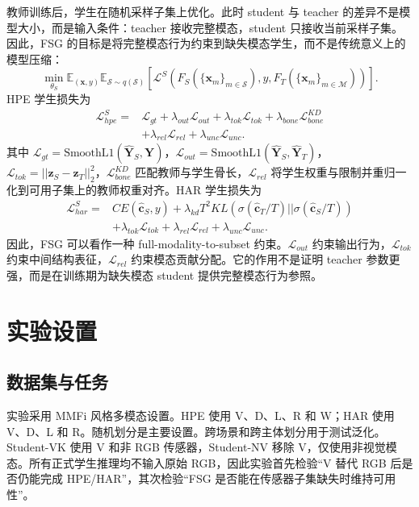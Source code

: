 ﻿\documentclass[UTF8,twocolumn]{ctexart}
\begin{document}
教师训练后，学生在随机采样子集上优化。此时 student 与 teacher 的差异不是模型大小，而是输入条件：teacher 接收完整模态，student 只接收当前采样子集。因此，FSG 的目标是将完整模态行为约束到缺失模态学生，而不是传统意义上的模型压缩：
\begin{equation}
    \min_{\theta_S}
    \mathbb{E}_{(\mathbf{x},y)}
    \mathbb{E}_{\mathcal{S}\sim q(\mathcal{S})}
    \left[
    \mathcal{L}^{S}
    (F_S(\{\mathbf{x}_m\}_{m\in\mathcal{S}}),y,F_T(\{\mathbf{x}_m\}_{m\in\mathcal{M}}))
    \right].
\end{equation}
HPE 学生损失为
\begin{equation}
\begin{aligned}
    \mathcal{L}^{S}_{hpe}=&
    \mathcal{L}_{gt}
    +\lambda_{out}\mathcal{L}_{out}
    +\lambda_{tok}\mathcal{L}_{tok}
    +\lambda_{bone}\mathcal{L}^{KD}_{bone} \\
    &+\lambda_{rel}\mathcal{L}_{rel}
    +\lambda_{unc}\mathcal{L}_{unc}.
\end{aligned}
\end{equation}
其中 $\mathcal{L}_{gt}=\mathrm{SmoothL1}(\hat{\mathbf{Y}}_S,\mathbf{Y})$，$\mathcal{L}_{out}=\mathrm{SmoothL1}(\hat{\mathbf{Y}}_S,\hat{\mathbf{Y}}_T)$，$\mathcal{L}_{tok}=||\mathbf{z}_S-\mathbf{z}_T||_2^2$，$\mathcal{L}^{KD}_{bone}$ 匹配教师与学生骨长，$\mathcal{L}_{rel}$ 将学生权重与限制并重归一化到可用子集上的教师权重对齐。HAR 学生损失为
\begin{equation}
\begin{aligned}
    \mathcal{L}^{S}_{har}=&
    CE(\hat{\mathbf{c}}_S,y)
    +\lambda_{kd}T^2 KL(\sigma(\hat{\mathbf{c}}_T/T)||\sigma(\hat{\mathbf{c}}_S/T))\\
    &+\lambda_{tok}\mathcal{L}_{tok}
    +\lambda_{rel}\mathcal{L}_{rel}
    +\lambda_{unc}\mathcal{L}_{unc}.
\end{aligned}
\end{equation}
因此，FSG 可以看作一种 full-modality-to-subset 约束。$\mathcal{L}_{out}$ 约束输出行为，$\mathcal{L}_{tok}$ 约束中间结构表征，$\mathcal{L}_{rel}$ 约束模态贡献分配。它的作用不是证明 teacher 参数更强，而是在训练期为缺失模态 student 提供完整模态行为参照。

\section{实验设置}
\subsection{数据集与任务}
实验采用 MMFi 风格多模态设置。HPE 使用 V、D、L、R 和 W；HAR 使用 V、D、L 和 R。随机划分是主要设置。跨场景和跨主体划分用于测试泛化。Student-VK 使用 V 和非 RGB 传感器，Student-NV 移除 V，仅使用非视觉模态。所有正式学生推理均不输入原始 RGB，因此实验首先检验“V 替代 RGB 后是否仍能完成 HPE/HAR”，其次检验“FSG 是否能在传感器子集缺失时维持可用性”。
\end{document}
